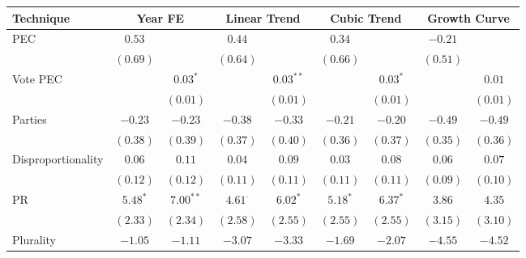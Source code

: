 \begin{table}
\begin{center}
\begin{tabular}{l c c c c c c c c }
\toprule
Technique & \multicolumn{2}{c}{Year FE} & \multicolumn{2}{c}{Linear Trend} & \multicolumn{2}{c}{Cubic Trend} & \multicolumn{2}{c}{Growth Curve} \\
\midrule
PEC                            & $0.53$       &               & $0.44$         &                & $0.34$         &                & $-0.21$         &                 \\
                               & $(0.69)$     &               & $(0.64)$       &                & $(0.66)$       &                & $(0.51)$        &                 \\
Vote PEC                       &              & $0.03^{*}$    &                & $0.03^{**}$    &                & $0.03^{*}$     &                 & $0.01$          \\
                               &              & $(0.01)$      &                & $(0.01)$       &                & $(0.01)$       &                 & $(0.01)$        \\
Parties                        & $-0.23$      & $-0.23$       & $-0.38$        & $-0.33$        & $-0.21$        & $-0.20$        & $-0.49$         & $-0.49$         \\
                               & $(0.38)$     & $(0.39)$      & $(0.37)$       & $(0.40)$       & $(0.36)$       & $(0.37)$       & $(0.35)$        & $(0.36)$        \\
Disproportionality             & $0.06$       & $0.11$        & $0.04$         & $0.09$         & $0.03$         & $0.08$         & $0.06$          & $0.07$          \\
                               & $(0.12)$     & $(0.12)$      & $(0.11)$       & $(0.11)$       & $(0.11)$       & $(0.11)$       & $(0.09)$        & $(0.10)$        \\
PR                             & $5.48^{*}$   & $7.00^{**}$   & $4.61^{\cdot}$ & $6.02^{*}$     & $5.18^{*}$     & $6.37^{*}$     & $3.86$          & $4.35$          \\
                               & $(2.33)$     & $(2.34)$      & $(2.58)$       & $(2.55)$       & $(2.55)$       & $(2.55)$       & $(3.15)$        & $(3.10)$        \\
Plurality                      & $-1.05$      & $-1.11$       & $-3.07$        & $-3.33$        & $-1.69$        & $-2.07$        & $-4.55$         & $-4.52$         \\

\end{tabular}
\end{center}
\end{table}
